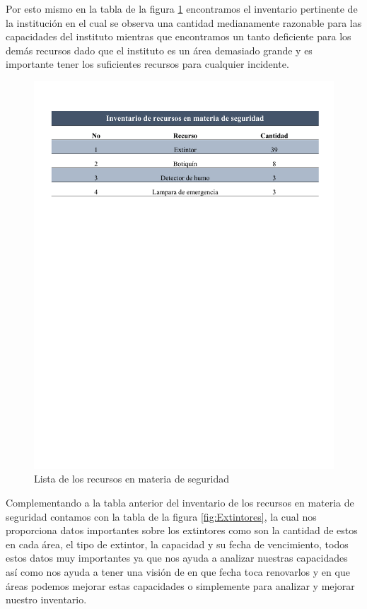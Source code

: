     Por esto mismo en la tabla de la figura \ref{fig:inventarioRecursos} encontramos el inventario pertinente de la institución en el cual se observa una cantidad medianamente razonable para las capacidades del instituto mientras que encontramos un tanto deficiente para los demás recursos dado que el instituto es un área demasiado grande y es importante tener los suficientes recursos para cualquier incidente.
    
    
    \begin{figure}[H]
      \centering
      \includegraphics[trim = {10mm 180mm 10mm 15mm},clip,scale=0.35]{22/Img/inventarioDeRecursos.pdf}
       \caption{Lista de los recursos en materia de seguridad}
       \label{fig:inventarioRecursos}
     \end{figure}
    
    Complementando a la tabla anterior del inventario de los recursos en materia de seguridad contamos con la tabla de la figura \ref{fig:Extintores}, la cual nos proporciona datos importantes sobre los extintores como son la cantidad de estos en cada área, el tipo de extintor, la capacidad y su fecha de vencimiento, todos estos datos muy importantes ya que nos ayuda a analizar nuestras capacidades así como nos ayuda a tener una visión de en que fecha toca renovarlos y en que áreas podemos mejorar estas capacidades o simplemente para analizar y mejorar nuestro inventario.
    
